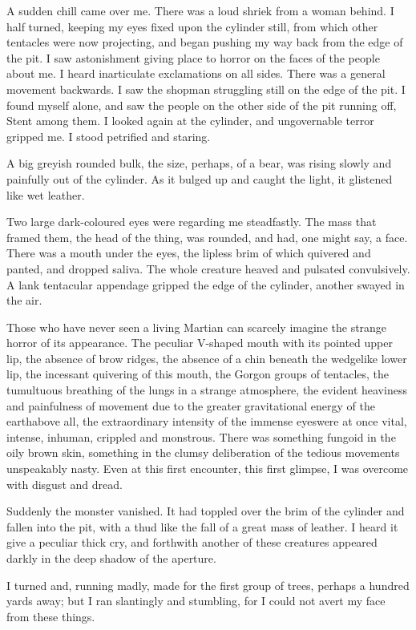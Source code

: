 A sudden chill came over me. There was a loud shriek from a woman
behind. I half turned, keeping my eyes fixed upon the cylinder
still, from which other tentacles were now projecting, and began
pushing my way back from the edge of the pit. I saw astonishment
giving place to horror on the faces of the people about me. I heard
inarticulate exclamations on all sides. There was a general
movement backwards. I saw the shopman struggling still on the edge
of the pit. I found myself alone, and saw the people on the other
side of the pit running off, Stent among them. I looked again at
the cylinder, and ungovernable terror gripped me. I stood petrified
and staring.

A big greyish rounded bulk, the size, perhaps, of a bear, was
rising slowly and painfully out of the cylinder. As it bulged up
and caught the light, it glistened like wet leather.

Two large dark-coloured eyes were regarding me steadfastly. The
mass that framed them, the head of the thing, was rounded, and had,
one might say, a face. There was a mouth under the eyes, the
lipless brim of which quivered and panted, and dropped saliva. The
whole creature heaved and pulsated convulsively. A lank tentacular
appendage gripped the edge of the cylinder, another swayed in the
air.

Those who have never seen a living Martian can scarcely imagine the
strange horror of its appearance. The peculiar V-shaped mouth with
its pointed upper lip, the absence of brow ridges, the absence of a
chin beneath the wedgelike lower lip, the incessant quivering of
this mouth, the Gorgon groups of tentacles, the tumultuous
breathing of the lungs in a strange atmosphere, the evident
heaviness and painfulness of movement due to the greater
gravitational energy of the earth\dash{}above all, the extraordinary
intensity of the immense eyes\dash{}were at once vital, intense,
inhuman, crippled and monstrous. There was something fungoid in the
oily brown skin, something in the clumsy deliberation of the
tedious movements unspeakably nasty. Even at this first encounter,
this first glimpse, I was overcome with disgust and dread.

Suddenly the monster vanished. It had toppled over the brim of the
cylinder and fallen into the pit, with a thud like the fall of a
great mass of leather. I heard it give a peculiar thick cry, and
forthwith another of these creatures appeared darkly in the deep
shadow of the aperture.

I turned and, running madly, made for the first group of trees,
perhaps a hundred yards away; but I ran slantingly and stumbling,
for I could not avert my face from these things.

